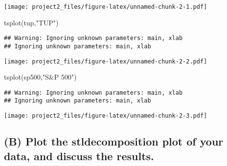 \documentclass[
  10.5pt,
]{article}
\newenvironment{Shaded}{\begin{snugshade}}{\end{snugshade}}
\newcommand{\FunctionTok}[1]{\textcolor[rgb]{0.00,0.00,0.00}{#1}}
\newcommand{\NormalTok}[1]{#1}
\newcommand{\StringTok}[1]{\textcolor[rgb]{0.31,0.60,0.02}{#1}}
\begin{document}
\texttt{[image: project2\_files/figure-latex/unnamed-chunk-2-1.pdf]}

\begin{Shaded}
\begin{Highlighting}[]
\FunctionTok{tsplot}\NormalTok{(tup,}\StringTok{"TUP"}\NormalTok{)}
\end{Highlighting}
\end{Shaded}

\begin{verbatim}
## Warning: Ignoring unknown parameters: main, xlab
## Ignoring unknown parameters: main, xlab
\end{verbatim}

\texttt{[image: project2\_files/figure-latex/unnamed-chunk-2-2.pdf]}

\begin{Shaded}
\begin{Highlighting}[]
\FunctionTok{tsplot}\NormalTok{(sp500,}\StringTok{"S\&P 500"}\NormalTok{)}
\end{Highlighting}
\end{Shaded}

\begin{verbatim}
## Warning: Ignoring unknown parameters: main, xlab
## Ignoring unknown parameters: main, xlab
\end{verbatim}

\texttt{[image: project2\_files/figure-latex/unnamed-chunk-2-3.pdf]}

\hypertarget{b-plot-the-stldecomposition-plot-of-your-data-and-discuss-the-results.}{%
\subsection{(B) Plot the stldecomposition plot of your data, and discuss
the
results.}\label{b-plot-the-stldecomposition-plot-of-your-data-and-discuss-the-results.}}
\end{document}
